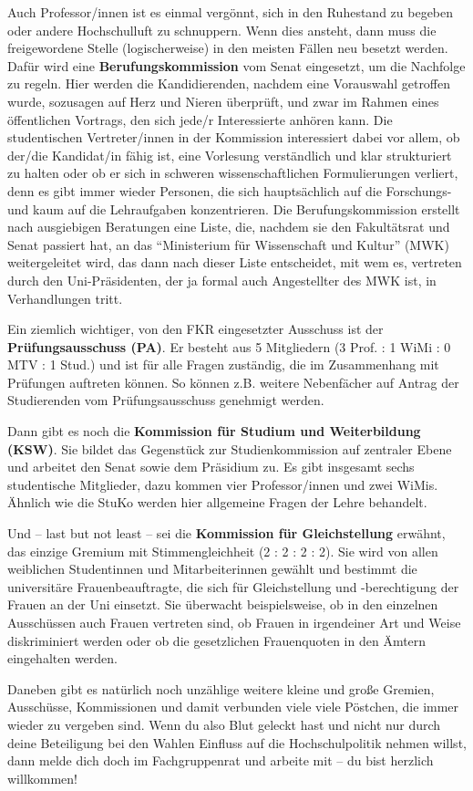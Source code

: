 Auch Professor/innen ist es einmal vergönnt, sich in den Ruhestand zu begeben oder andere Hochschulluft zu schnuppern. Wenn dies ansteht, dann muss die freigewordene Stelle (logischerweise) in den meisten Fällen neu besetzt werden. Dafür wird eine \textbf{Berufungskommission} vom Senat eingesetzt, um die Nachfolge zu regeln. Hier werden die Kandidierenden, nachdem eine Vorauswahl getroffen wurde, sozusagen auf Herz und Nieren überprüft, und zwar im Rahmen eines öffentlichen Vortrags, den sich jede/r Interessierte anhören kann. Die studentischen Vertreter/innen in der Kommission interessiert dabei vor allem, ob der/die Kandidat/in fähig ist, eine Vorlesung verständlich und klar strukturiert zu halten oder ob er sich in schweren wissenschaftlichen Formulierungen verliert, denn es gibt immer wieder Personen, die sich hauptsächlich auf die Forschungs- und kaum auf die Lehraufgaben konzentrieren. Die Berufungskommission erstellt nach ausgiebigen Beratungen eine Liste, die, nachdem sie den Fakultätsrat und Senat passiert hat, an das \enquote{Ministerium für Wissenschaft und Kultur} (MWK) weitergeleitet wird, das dann nach dieser Liste entscheidet, mit wem es, vertreten durch den Uni-Präsidenten, der ja formal auch Angestellter des MWK ist, in Verhandlungen tritt.

Ein ziemlich wichtiger, von den FKR eingesetzter Ausschuss ist der \textbf{Prüfungsausschuss (PA)}. Er besteht aus 5 Mitgliedern (3 Prof. : 1 WiMi : 0 MTV : 1 Stud.) und ist für alle Fragen zuständig, die im Zusammenhang mit Prüfungen auftreten können. So können z.B. weitere Nebenfächer auf Antrag der Studierenden vom Prüfungsausschuss genehmigt werden.

Dann gibt es noch die \textbf{Kommission für Studium und Weiterbildung (KSW)}. Sie bildet das Gegenstück zur Studienkommission auf zentraler Ebene und arbeitet den Senat sowie dem Präsidium zu. Es gibt insgesamt sechs studentische Mitglieder, dazu kommen vier Professor/innen und zwei WiMis. Ähnlich wie die StuKo werden hier allgemeine Fragen der Lehre behandelt.

Und -- last but not least -- sei die \textbf{Kommission für Gleichstellung} erwähnt, das einzige Gremium mit Stimmengleichheit (2 : 2 : 2 : 2). Sie wird von allen weiblichen Studentinnen und Mitarbeiterinnen gewählt und bestimmt die universitäre Frauenbeauftragte, die sich für Gleichstellung und -berechtigung der Frauen an der Uni einsetzt. Sie überwacht beispielsweise, ob in den einzelnen Ausschüssen auch Frauen vertreten sind, ob Frauen in
irgendeiner Art und Weise diskriminiert werden oder ob die gesetzlichen Frauenquoten in den Ämtern eingehalten werden.

Daneben gibt es natürlich noch unzählige weitere kleine und große Gremien, Ausschüsse, Kommissionen und damit verbunden viele viele Pöstchen, die immer wieder zu vergeben sind. Wenn du also Blut geleckt hast und nicht nur durch deine Beteiligung bei den Wahlen Einfluss auf die Hochschulpolitik nehmen willst, dann melde dich doch im Fachgruppenrat und arbeite mit -- du bist herzlich willkommen!